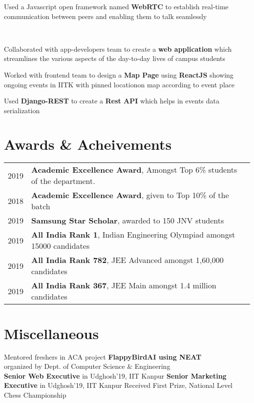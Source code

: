 \documentclass[]{deedy-resume-openfont}
\begin{document}
\begin{minipage}[t]{0.66\textwidth}
\begin{tightemize}
	\item Used a Javascript open framework named \textbf{WebRTC} to establish real-time communication between peers and enabling them to talk seamlessly
\end{tightemize}
\\
\begin{tightemize}
	\item Collaborated with app-developers team to create a \textbf{web application} which streamlines the various aspects of the day-to-day lives of campus students
	\item Worked with frontend team to design a \textbf{Map Page} using \textbf{ReactJS} showing ongoing events in IITK with pinned locationon map according to event place
	\item Used \textbf{Django-REST} to create  a \textbf{Rest API} which helps in events data serialization
\end{tightemize}

\section{Awards \& Acheivements} 
\begin{tabular}{rll}
2019	  & \textbf{Academic Excellence Award}, Amongst Top 6\% students of the department.\\
2018	    &\textbf{Academic Excellence Award}, given to Top 10\% of the batch\\
2019	      & \textbf{Samsung Star Scholar}, awarded to 150 JNV students\\
2019	      & \textbf{All India Rank 1}, Indian Engineering Olympiad amongst 15000 candidates\\
2019	      & \textbf{All India Rank 782}, JEE Advanced amongst 1,60,000 candidates\\
2019	      & \textbf{All India Rank 367}, JEE Main
amongst 1.4 million candidates
\end{tabular}

\section{Miscellaneous} 

\textbullet{} Mentored freshers in ACA project \textbf{{ FlappyBirdAI using NEAT}} \\
\hspace{2mm} organized by Dept. of Computer Science \& Engineering\\
\textbullet{} \textbf{ Senior Web Executive} in Udghosh'19, IIT Kanpur
\newline
\textbullet{} \textbf{ Senior Marketing Executive} in Udghosh'19, IIT Kanpur
\newline
\textbullet{} Received First Prize, National Level Chess Championship  

\end{minipage} 
\end{document}
